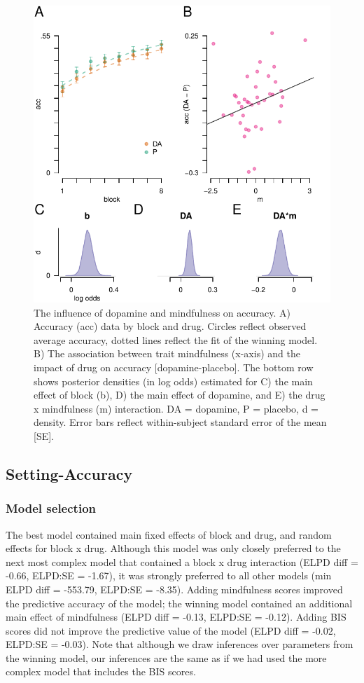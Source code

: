 \documentclass{article}
\begin{document}
\begin{figure}

{\centering \includegraphics[width=0.7\linewidth]{../../images/acc_fig} 

}

\caption{The influence of dopamine and mindfulness on accuracy. A) Accuracy (acc) data by block and drug. Circles reflect observed average accuracy, dotted lines reflect the fit of the winning model. B) The association between trait mindfulness (x-axis) and the impact of drug on accuracy [dopamine-placebo]. The bottom row shows posterior densities (in log odds) estimated for C) the main effect of block (b), D) the main effect of dopamine, and E) the drug x mindfulness (m) interaction. DA = dopamine, P = placebo, d = density. Error bars reflect within-subject standard error of the mean [SE].}\label{fig:accfig}
\end{figure}

\hypertarget{setting-accuracy-1}{%
\subsection{Setting-Accuracy}\label{setting-accuracy-1}}

\hypertarget{model-selection-1}{%
\subsubsection{Model selection}\label{model-selection-1}}

The best model contained main fixed effects of block and drug, and
random effects for block x drug. Although this model was only closely
preferred to the next most complex model that contained a block x drug
interaction (ELPD diff = -0.66, ELPD:SE = -1.67), it was strongly
preferred to all other models (min ELPD diff = -553.79, ELPD:SE =
-8.35). Adding mindfulness scores improved the predictive accuracy of
the model; the winning model contained an additional main effect of
mindfulness (ELPD diff = -0.13, ELPD:SE = -0.12). Adding BIS scores did
not improve the predictive value of the model (ELPD diff = -0.02,
ELPD:SE = -0.03). Note that although we draw inferences over parameters
from the winning model, our inferences are the same as if we had used
the more complex model that includes the BIS scores.
\end{document}
